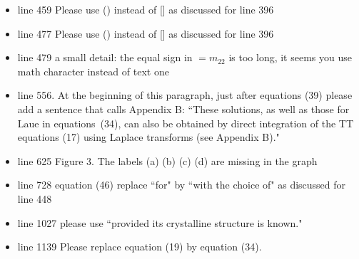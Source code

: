 \documentclass[]{article}
\begin{document}
\begin{itemize}
    \item line 459 Please use () instead of [] as discussed for line 396
    \item line 477 Please use () instead of [] as discussed for line 396
    \item line 479 a small detail: the equal sign in $=m_{22}$ is too long, it seems you use math character instead of text one
     \item line 556. At the beginning of this paragraph, just after equations (39) please add a sentence that calls Appendix B:  ``These solutions, as well as those for Laue in equations~(34), can also be obtained by direct integration of the TT equations (17) using Laplace transforms (see Appendix B)."
    \item line 625 Figure 3. The labels (a) (b) (c) (d) are missing in the graph
    \item line 728 equation (46) replace ``for" by ``with the choice of" as discussed for line 448
    \item line 1027 please use ``provided its crystalline structure is known."
    \item line 1139 Please replace equation (19) by equation (34).
\end{itemize}
\end{document}
